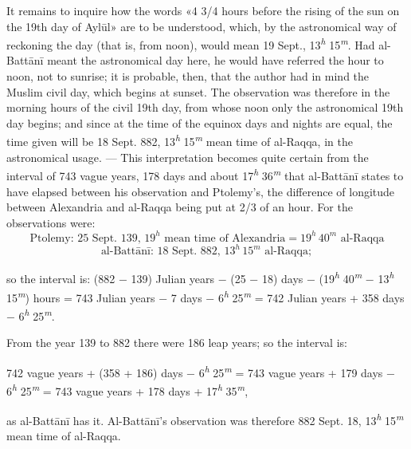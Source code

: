 \documentclass[11pt]{article}
\begin{document}
\par It remains to inquire how the words «4 3/4 hours before the rising of the sun on the 19th day of Aylūl» are to be understood, which, by the astronomical way of reckoning the day (that is, from noon), would mean 19 Sept., 13\textsuperscript{\itshape h} 15\textsuperscript{\itshape m}. Had al-Battānī meant the astronomical day here, he would have referred the hour to noon, not to sunrise; it is probable, then, that the author had in mind the Muslim civil day, which begins at sunset. The observation was therefore in the morning hours of the civil 19th day, from whose noon only the astronomical 19th day begins; and since at the time of the equinox days and nights are equal, the time given will be 18 Sept. 882, 13\textsuperscript{\itshape h} 15\textsuperscript{\itshape m} mean time of al-Raqqa, in the astronomical usage. — This interpretation becomes quite certain from the interval of 743 vague years, 178 days and about 17\textsuperscript{\itshape h} 36\textsuperscript{\itshape m} that al-Battānī states to have elapsed between his observation and Ptolemy's, the difference of longitude between Alexandria and al-Raqqa being put at 2/3 of an hour. For the observations were: \[ \text{Ptolemy: 25 Sept. 139, 19}^{h}\text{ mean time of Alexandria} = 19^{h}\,40^{m}\text{ al-Raqqa} \] \[ \text{al-Battānī: 18 Sept. 882, 13}^{h}\,15^{m}\text{ al-Raqqa}; \]\par
\par\begin{center}so the interval is: (882 − 139) Julian years − (25 − 18) days − (19\textsuperscript{\itshape h} 40\textsuperscript{\itshape m} − 13\textsuperscript{\itshape h} 15\textsuperscript{\itshape m}) hours = 743 Julian years − 7 days − 6\textsuperscript{\itshape h} 25\textsuperscript{\itshape m} = 742 Julian years + 358 days − 6\textsuperscript{\itshape h} 25\textsuperscript{\itshape m}.\end{center}
\par From the year 139 to 882 there were 186 leap years; so the interval is:\par
\par\begin{center}742 vague years + (358 + 186) days − 6\textsuperscript{\itshape h} 25\textsuperscript{\itshape m} = 743 vague years + 179 days − 6\textsuperscript{\itshape h} 25\textsuperscript{\itshape m} = 743 vague years + 178 days + 17\textsuperscript{\itshape h} 35\textsuperscript{\itshape m},\end{center}
\par as al-Battānī has it. Al-Battānī's observation was therefore 882 Sept. 18, 13\textsuperscript{\itshape h} 15\textsuperscript{\itshape m} mean time of al-Raqqa.\par
\end{document}
